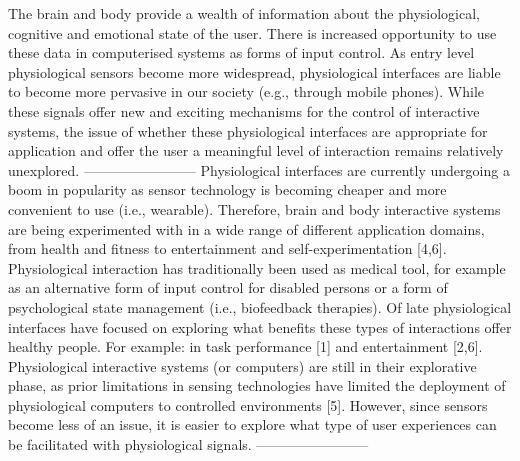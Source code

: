 The brain and body provide a wealth of information
about the physiological, cognitive and emotional state
of the user. There is increased opportunity to use these
data in computerised systems as forms of input control.
As entry level physiological sensors become more widespread,
physiological interfaces are liable to become
more pervasive in our society (e.g., through mobile
phones). While these signals offer new and exciting
mechanisms for the control of interactive systems, the
issue of whether these physiological interfaces are appropriate
for application and offer the user a meaningful
level of interaction remains relatively unexplored.
------------------------
Physiological interfaces are currently undergoing a
boom in popularity as sensor technology is becoming
cheaper and more convenient to use (i.e., wearable).
Therefore, brain and body interactive systems are being
experimented with in a wide range of different application
domains, from health and fitness to entertainment
and self-experimentation [4,6]. Physiological interaction
has traditionally been used as medical tool, for
example as an alternative form of input control for disabled
persons or a form of psychological state management
(i.e., biofeedback therapies). Of late physiological
interfaces have focused on exploring what benefits
these types of interactions offer healthy people.
For example: in task performance [1] and entertainment
[2,6]. Physiological interactive systems (or
computers) are still in their explorative phase, as prior
limitations in sensing technologies have limited the deployment
of physiological computers to controlled environments
[5]. However, since sensors become less of
an issue, it is easier to explore what type of user experiences
can be facilitated with physiological signals.
------------------------
